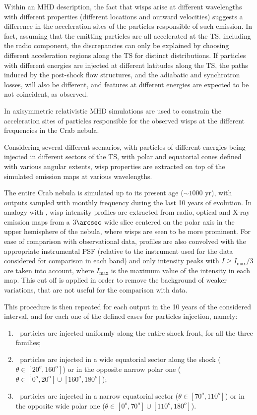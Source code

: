 Within an MHD description, the fact that wisps arise at different wavelengths with different properties (different locations and outward velocities) suggests a difference in the acceleration sites of the particles responsible of such emission.
In fact, assuming that the emitting particles are all accelerated at the TS, including the radio component, the discrepancies can only be explained by choosing different acceleration regions along the TS for distinct distributions. 
If particles with different energies are injected at different latitudes along the TS, the paths induced by the post-shock flow structures, and the adiabatic and synchrotron losses, will also be different, and features at different energies are expected to be not coincident, as observed.

In \citet{Olmi:2015} axisymmetric relativistic  MHD simulations are used to constrain the acceleration sites of particles responsible for the observed wisps at the different frequencies in the Crab nebula. 

Considering several different scenarios, with particles of different energies being injected in different sectors of the TS, with polar and equatorial cones defined with various angular extents, wisp properties are extracted on top of the simulated emission maps at various wavelengths.

The entire Crab nebula is simulated up to its present age ($\sim 1000$ yr), with outputs sampled with monthly frequency during the last 10 years of evolution. 
In analogy with \citet{Schweizer:2013}, wisp intensity profiles are extracted from radio, optical and X-ray emission maps from a $3\arcsec$ wide slice centered on the polar axis in the upper hemisphere of the nebula, where wisps are seen to be more prominent.
For ease of comparison with observational data, profiles are also convolved with the appropriate instrumental PSF (relative to the instrument used for the data considered for comparison in each band) and only intensity peaks with $I\geq I_\mathrm{max}/3$ are taken into account, where $I_\mathrm{max}$ is the maximum value of the intensity in each map. 
This cut off is applied in order to remove the background of weaker variations, that are not useful for the comparison with data. 

This procedure is then repeated for each output in the 10 years of the considered interval, and for each one of the defined cases for particles injection, namely:
\begin{enumerate}[(1)]
	\item  $\;$ particles are injected uniformly along the entire shock front, for all the three families;
	\item  $\;$ particles are injected in a wide equatorial sector along the shock ($\theta \in \left[ 20^o, 160^o \right]$) or in the opposite narrow polar one ($\theta \in \left[ 0^o, 20^o \right]\cup\left[ 160^o, 180^o \right]$);
	\item  $\;$ particles are injected in a narrow equatorial sector ($\theta \in \left[ 70^o, 110^o \right]$) or in the opposite wide polar one ($\theta \in \left[ 0^o, 70^o \right]\cup\left[ 110^o, 180^o \right]$).
\end{enumerate}

